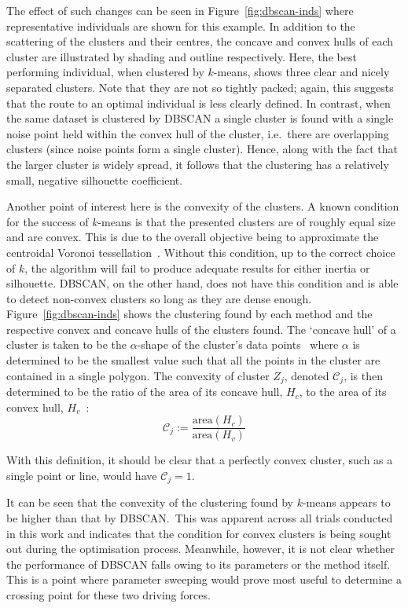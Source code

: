 The effect of such changes can be seen in Figure~\ref{fig:dbscan-inds} where
representative individuals are shown for this example. In addition to the
scattering of the clusters and their centres, the concave and convex hulls of
each cluster are illustrated by shading and outline respectively. Here, the best
performing individual, when clustered by \(k\)-means, shows three clear and
nicely separated clusters. Note that they are not so tightly packed; again, this
suggests that the route to an optimal individual is less clearly defined. In
contrast, when the same dataset is clustered by DBSCAN a single cluster is found
with a single noise point held within the convex hull of the cluster, i.e.\
there are overlapping clusters (since noise points form a single cluster).
Hence, along with the fact that the larger cluster is widely spread, it follows
that the clustering has a relatively small, negative silhouette coefficient.

Another point of interest here is the convexity of the clusters. A known
condition for the success of \(k\)-means is that the presented clusters are of
roughly equal size and are convex. This is due to the overall objective being to
approximate the centroidal Voronoi tessellation~\cite{Du2006}. Without this
condition, up to the correct choice of \(k\), the algorithm will fail to produce
adequate results for either inertia or silhouette. DBSCAN, on the other hand,
does not have this condition and is able to detect non-convex clusters so long
as they are dense enough. Figure~\ref{fig:dbscan-inds} shows the clustering
found by each method and the respective convex and concave hulls of the clusters
found. The `concave hull' of a cluster is taken to be the \(\alpha\)-shape of
the cluster's data points~\cite{Edelsbrunner1983} where \(\alpha\) is determined
to be the smallest value such that all the points in the cluster are contained
in a single polygon. The convexity of cluster \(Z_j\), denoted
\(\mathcal{C}_j\), is then determined to be the ratio of the area of its concave
hull, \(H_c\), to the area of its convex hull, \(H_v\)~\cite{Sonka1993}:
\begin{equation}
    \mathcal{C}_j :=
    \frac{\text{area}\left(H_c\right)}{\text{area}\left(H_v\right)}
\end{equation}

With this definition, it should be clear that a perfectly convex cluster, such
as a single point or line, would have \(\mathcal{C}_j = 1\).

It can be seen that the convexity of the clustering found by \(k\)-means appears
to be higher than that by DBSCAN.\ This was apparent across all trials conducted
in this work and indicates that the condition for convex clusters is being
sought out during the optimisation process. Meanwhile, however, it is not clear
whether the performance of DBSCAN falls owing to its parameters or the method
itself. This is a point where parameter sweeping would prove most useful to
determine a crossing point for these two driving forces.

